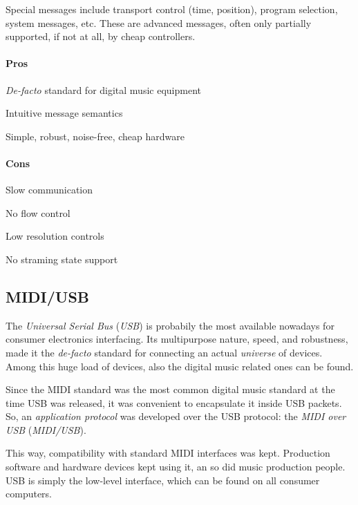 \documentclass[a4paper,10pt]{article}
\begin{document}
\begin{multicols}{2}
Special messages include transport control (time, position), program selection,
system messages, etc. These are advanced messages, often only partially
supported, if not at all, by cheap controllers.


\paragraph{Pros}
\begin{itemize*}
	\item \emph{De-facto} standard for digital music equipment
	\item Intuitive message semantics
	\item Simple, robust, noise-free, cheap hardware
\end{itemize*}


\paragraph{Cons}
\begin{itemize*}
	\item Slow communication
	\item No flow control
	\item Low resolution controls
	\item No straming state support
\end{itemize*}


\subsection{MIDI/USB}

The \emph{Universal Serial Bus} (\emph{USB}) \CITEME is probabily the most
available nowadays for consumer electronics interfacing. Its multipurpose
nature, speed, and robustness, made it the \emph{de-facto} standard for
connecting an actual \emph{universe} of devices. Among this huge load of
devices, also the digital music related ones can be found.

Since the MIDI standard was the most common digital music standard at the time
USB was released, it was convenient to encapsulate it inside USB packets.
So, an \emph{application protocol} was developed over the USB protocol: the
\emph{MIDI over USB} (\emph{MIDI/USB}).

This way, compatibility with standard MIDI interfaces was kept. Production
software and hardware devices kept using it, an so did music production
people. USB is simply the low-level interface, which can be found on all
consumer computers.


\end{multicols}
\end{document}

